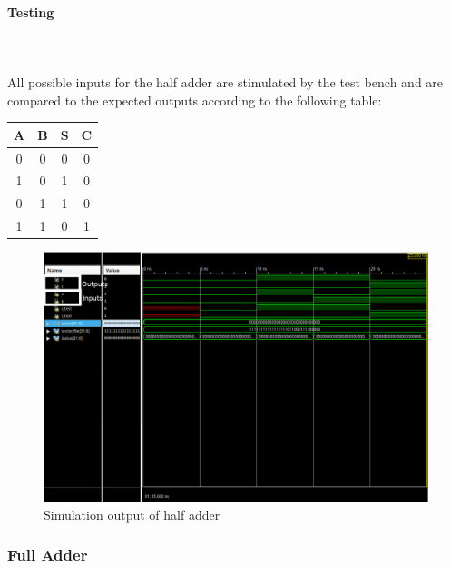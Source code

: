 \documentclass{article}
\begin{document}
    \paragraph{Testing}
    \hfill\\\\
    All possible inputs for the half adder are stimulated by the test bench
    and are compared to the expected outputs according to the following
    table:

    \begin{center}
        \begin{tabular}{|c|c||c|c|}
            \hline
            A & B & S & C
            \\\hline\hline
            0 & 0 & 0 & 0
            \\\hline
            1 & 0 & 1 & 0
            \\\hline
            0 & 1 & 1 & 0
            \\\hline
            1 & 1 & 0 & 1
            \\\hline
        \end{tabular}
    \end{center}

    \begin{figure}[H]
        \centering
        \includegraphics[width=0.9\paperwidth,center]{Screenshots/half_adder.png}
        \caption{Simulation output of half adder}
    \end{figure}




    \subsubsection{Full Adder}
\end{document}
